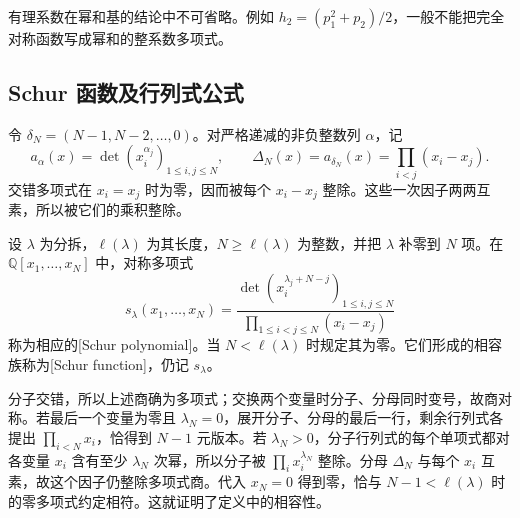有理系数在幂和基的结论中不可省略。例如 \(h_2=(p_1^2+p_2)/2\)，一般不能把完全对称函数写成幂和的整系数多项式。

\subsection{Schur 函数及行列式公式}
\label{b5:subsec:0701:02}

令 \(\delta_N=(N-1,N-2,\ldots,0)\)。对严格递减的非负整数列 \(\alpha\)，记
\[
	a_\alpha(x)=\det(x_i^{\alpha_j})_{1\le i,j\le N}, \qquad \Delta_N(x)=a_{\delta_N}(x)=\prod_{i<j}(x_i-x_j).
\]
交错多项式在 \(x_i=x_j\) 时为零，因而被每个 \(x_i-x_j\) 整除。这些一次因子两两互素，所以被它们的乘积整除。

\begin{definition}\label{b5:def:schur-function}
	设 \(\lambda\) 为分拆，\(\ell(\lambda)\) 为其长度，\(N\ge\ell(\lambda)\) 为整数，并把 \(\lambda\) 补零到 \(N\) 项。在 \(\mathbb Q[x_1,\ldots,x_N]\) 中，对称多项式
	\[
		s_\lambda(x_1,\ldots,x_N) =\frac{\det(x_i^{\lambda_j+N-j})_{1\le i,j\le N}} {\prod_{1\le i<j\le N}(x_i-x_j)}
	\]
	称为相应的[Schur polynomial]。当 \(N<\ell(\lambda)\) 时规定其为零。它们形成的相容族称为[Schur function]，仍记 \(s_\lambda\)。
\end{definition}

分子交错，所以上述商确为多项式；交换两个变量时分子、分母同时变号，故商对称。若最后一个变量为零且 \(\lambda_N=0\)，展开分子、分母的最后一行，剩余行列式各提出 \(\prod_{i<N}x_i\)，恰得到 \(N-1\) 元版本。若 \(\lambda_N>0\)，分子行列式的每个单项式都对各变量 \(x_i\) 含有至少 \(\lambda_N\) 次幂，所以分子被 \(\prod_i x_i^{\lambda_N}\) 整除。分母 \(\Delta_N\) 与每个 \(x_i\) 互素，故这个因子仍整除多项式商。代入 \(x_N=0\) 得到零，恰与 \(N-1<\ell(\lambda)\) 时的零多项式约定相符。这就证明了定义中的相容性。

